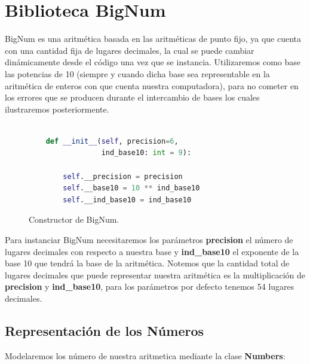 \documentclass[a4paper,10pt,twocolumn]{article}
\begin{document}
\section{Biblioteca BigNum}\label{sec:big_num}
	BigNum es una aritmética basada en las aritméticas de punto fijo, ya que cuenta con una cantidad fija de lugares decimales, la cual se puede cambiar dinámicamente desde el código una vez que se instancia. Utilizaremos como base las potencias de 10 (siempre y cuando dicha base sea representable en la aritmética de enteros con que cuenta nuestra computadora), para no cometer en los errores que se producen durante el intercambio de bases los cuales ilustraremos posteriormente.

  

		\begin{figure}[htb]%
			\begin{lstlisting}[language=python]%

    def __init__(self, precision=6,
                 ind_base10: int = 9):
                 
        self.__precision = precision
        self.__base10 = 10 ** ind_base10
        self.__ind_base10 = ind_base10


			\end{lstlisting}
		\caption{Constructor de BigNum.\label{fig:code}}
		\end{figure}
	
	Para instanciar BigNum necesitaremos los parámetros \textbf{precision} el número de lugares decimales con respecto a nuestra base y \textbf{ind\_base10} el exponente de la base 10 que tendrá la base de la aritmética. Notemos que la cantidad total de lugares decimales que puede representar nuestra aritmética es la multiplicación de
\textbf{precision} y  \textbf{ind\_base10}, para los parámetros por defecto tenemos 54 lugares decimales.
  
	
\subsection{Representación de los Números}\label{sub:representation}
	Modelaremos los número de nuestra aritmetica mediante la clase \textbf{Numbers}:
\end{document}
